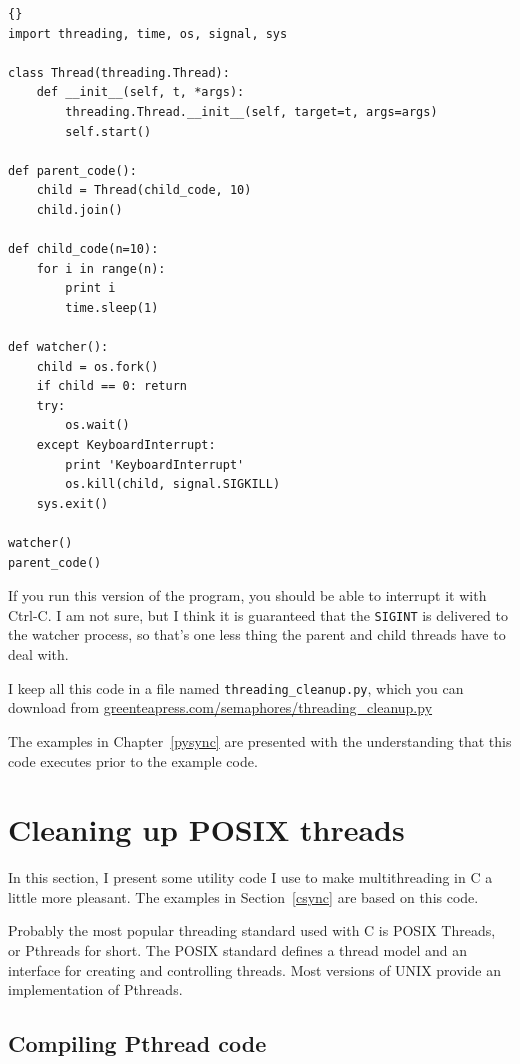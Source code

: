 \documentclass{book}
\begin{document}
\begin{latin}
\begin{lstlisting}[title={The watcher}]{}
import threading, time, os, signal, sys

class Thread(threading.Thread):
    def __init__(self, t, *args):
        threading.Thread.__init__(self, target=t, args=args)
        self.start()

def parent_code():
    child = Thread(child_code, 10)
    child.join()

def child_code(n=10):
    for i in range(n):
        print i
        time.sleep(1)

def watcher():
    child = os.fork()
    if child == 0: return
    try:
        os.wait()
    except KeyboardInterrupt:
        print 'KeyboardInterrupt'
        os.kill(child, signal.SIGKILL)
    sys.exit()

watcher()
parent_code()
\end{lstlisting}
\end{latin}

If you run this version of the program, you should be able
to interrupt it with Ctrl-C.  I am not sure, but I think it
is guaranteed that the {\tt SIGINT} is delivered to the
watcher process, so that's one less thing the
parent and child threads have to deal with.

I keep all this code in a file named {\tt threading\_cleanup.py},
which you can download from
\url{greenteapress.com/semaphores/threading\_cleanup.py}


The examples in Chapter~\ref{pysync} are presented with the understanding
that this code executes prior to the example code.


\chapter{Cleaning up POSIX threads}
\label{ccleanup}

In this section, I present some utility code I use to make
multithreading in C a little more pleasant.  The examples in
Section~\ref{csync} are based on this code.

Probably the most popular threading standard used with C is
POSIX Threads, or Pthreads for short.  The POSIX standard defines
a thread model and an interface for creating and controlling
threads.  Most versions of UNIX provide an implementation of
Pthreads.

\section{Compiling Pthread code}
\end{document}
